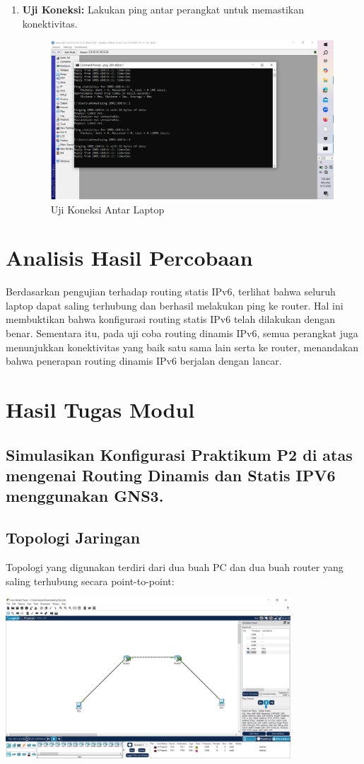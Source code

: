 \begin{enumerate}
    \item \textbf{Uji Koneksi:} Lakukan ping antar perangkat untuk memastikan konektivitas.
    \begin{figure}[H]
        \centering
        \includegraphics[width=0.5\linewidth]{P2/img/ping1.png}
        \caption{Uji Koneksi Antar Laptop}
        \label{fig:gambar7}
    \end{figure}
\end{enumerate}

\section{Analisis Hasil Percobaan}
Berdasarkan pengujian terhadap routing statis IPv6, terlihat bahwa seluruh laptop dapat saling terhubung dan berhasil melakukan ping ke router. Hal ini membuktikan bahwa konfigurasi routing statis IPv6 telah dilakukan dengan benar. Sementara itu, pada uji coba routing dinamis IPv6, semua perangkat juga menunjukkan konektivitas yang baik satu sama lain serta ke router, menandakan bahwa penerapan routing dinamis IPv6 berjalan dengan lancar.

\section{Hasil Tugas Modul}
\subsection{Simulasikan Konfigurasi Praktikum P2 di atas mengenai Routing Dinamis dan Statis IPV6 menggunakan GNS3.}

\subsection{Topologi Jaringan}
Topologi yang digunakan terdiri dari dua buah PC dan dua buah router yang saling terhubung secara point-to-point:

\begin{center}
\includegraphics[width=0.8\textwidth]{P2/img/paket.png}
\end{center}

